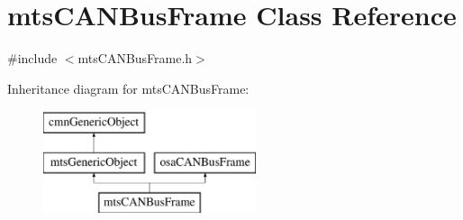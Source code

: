 \hypertarget{classmts_c_a_n_bus_frame}{}\section{mts\+C\+A\+N\+Bus\+Frame Class Reference}
\label{classmts_c_a_n_bus_frame}


{\ttfamily \#include $<$mts\+C\+A\+N\+Bus\+Frame.\+h$>$}

Inheritance diagram for mts\+C\+A\+N\+Bus\+Frame\+:\begin{figure}[H]
\begin{center}
\leavevmode
\includegraphics[height=3.000000cm]{df/da2/classmts_c_a_n_bus_frame}
\end{center}
\end{figure}
